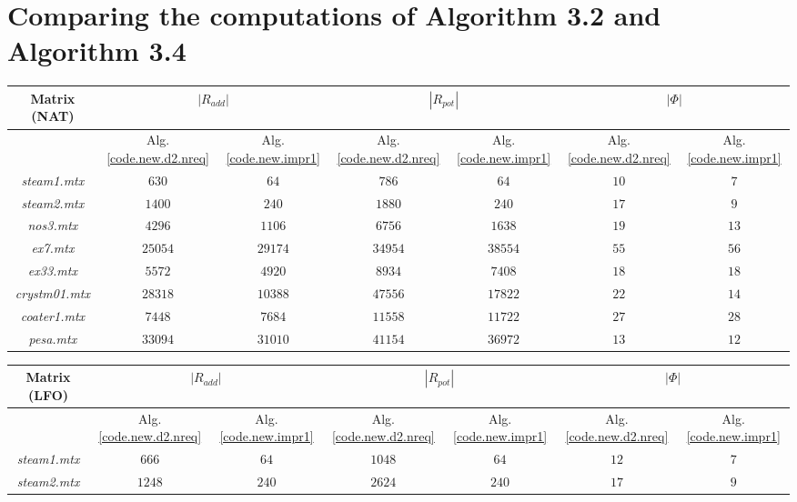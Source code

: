 \documentclass[12pt, twoside,a4paper,toc=bibliography]{scrbook}
\begin{document}
\section{Comparing the computations of Algorithm 3.2 and Algorithm 3.4}
\label{app.compare.alg32.alg34}
\begin{table}
\centering
\begin{tabular}{|c|c|c|c|c|c|c|}
\hline
Matrix (NAT) & \multicolumn{2}{c|}{$|R_{add}|$} & \multicolumn{2}{c|}{$|R_{pot}|$} & \multicolumn{2}{c|}{$|\Phi|$}\\\hline
{} & Alg.\ref{code.new.d2.nreq}& Alg.\ref{code.new.impr1} & Alg.\ref{code.new.d2.nreq} & Alg.\ref{code.new.impr1}& Alg.\ref{code.new.d2.nreq} & Alg.\ref{code.new.impr1}\\\hline
\textit{steam1.mtx} & $630$ & $64$ & $786$ & $64$ & $10$ & $7$\\\hline
\textit{steam2.mtx} & $1400$ & $240$ & $1880$ & $240$ & $17$ & $9$\\\hline
\textit{nos3.mtx} & $4296$ & $1106$ & $6756$ & $1638$ & $19$ & $13$\\\hline
\textit{ex7.mtx} & $25054$ & $29174$ & $34954$ & $38554$ & $55$ & $56$\\\hline
\textit{ex33.mtx} & $5572$ & $4920$ & $8934$ & $7408$ & $18$ & $18$\\\hline
\textit{crystm01.mtx} & $28318$ & $10388$ & $47556$ & $17822$ & $22$ & $14$\\\hline
\textit{coater1.mtx} & $7448$ & $7684$ & $11558$ & $11722$ & $27$ & $28$\\\hline
\textit{pesa.mtx} & $33094$ & $31010$ & $41154$ & $36972$ & $13$ & $12$\\\hline
\end{tabular}
\vspace*{1cm}\newline
\begin{tabular}{|c|c|c|c|c|c|c|}
\hline
Matrix (LFO) & \multicolumn{2}{c|}{$|R_{add}|$} & \multicolumn{2}{c|}{$|R_{pot}|$} & \multicolumn{2}{c|}{$|\Phi|$}\\\hline
{} & Alg.\ref{code.new.d2.nreq}& Alg.\ref{code.new.impr1} & Alg.\ref{code.new.d2.nreq} & Alg.\ref{code.new.impr1}& Alg.\ref{code.new.d2.nreq} & Alg.\ref{code.new.impr1}\\\hline
\textit{steam1.mtx} & $666$ & $64$ & $1048$ & $64$ & $12$ & $7$\\\hline
\textit{steam2.mtx} & $1248$ & $240$ & $2624$ & $240$ & $17$ & $9$\\\hline

\end{tabular}
\end{table}
\end{document}
